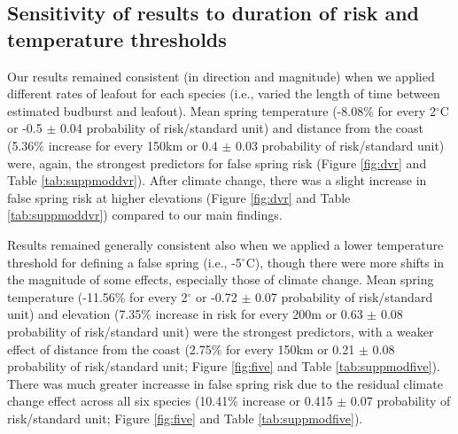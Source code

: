 \documentclass{article}\usepackage[]{graphicx}\usepackage[]{color}
\begin{document}

\subsection*{Sensitivity of results to duration of risk and temperature thresholds}
Our results remained consistent (in direction and magnitude) when we applied different rates of leafout for each species (i.e., varied the length of time between estimated budburst and leafout). Mean spring temperature (-8.08\% for every 2$^\circ$C or -0.5 $\pm$ 0.04 probability of risk/standard unit) and distance from the coast (5.36\% increase for every 150km or 0.4 $\pm$ 0.03 probability of risk/standard unit) were, again, the strongest predictors for false spring risk (Figure \ref{fig:dvr} and Table \ref{tab:suppmoddvr}). After climate change, there was a slight increase in false spring risk at higher elevations (Figure \ref{fig:dvr} and Table \ref{tab:suppmoddvr}) compared to our main findings. 

Results remained generally consistent also when we applied a lower temperature threshold for defining a false spring (i.e., -5$^{\circ}$C), though there were more shifts in the magnitude of some effects, especially those of climate change. Mean spring temperature (-11.56\% for every 2$^\circ$ or -0.72 $\pm$ 0.07 probability of risk/standard unit) and elevation (7.35\% increase in risk for every 200m or 0.63 $\pm$ 0.08 probability of risk/standard unit) were the strongest predictors, with a weaker effect of distance from the coast (2.75\% for every 150km or 0.21 $\pm$ 0.08 probability of risk/standard unit; Figure \ref{fig:five} and Table \ref{tab:suppmodfive}). There was much greater increasse in false spring risk due to the residual climate change effect across all six species (10.41\% increase or 0.415 $\pm$ 0.07 probability of risk/standard unit; Figure \ref{fig:five} and Table \ref{tab:suppmodfive}). 
\end{document}
